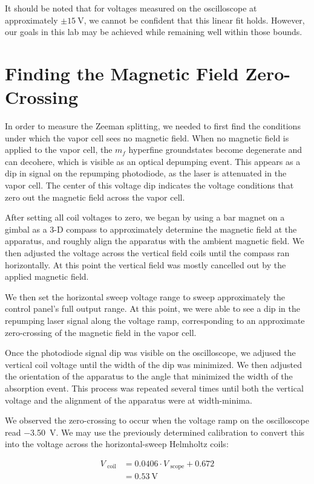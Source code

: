 \documentclass[letter]{article}
\begin{document}
It should be noted that for voltages measured on the oscilloscope at approximately $\pm \qty{15}{\V}$, we cannot be confident that this linear fit holds. However, our goals in this lab may be achieved while remaining well within those bounds.


\section{Finding the Magnetic Field Zero-Crossing}

In order to measure the Zeeman splitting, we needed to first find the conditions under which the vapor cell sees no magnetic field. When no magnetic field is applied to the vapor cell, the $m_f$ hyperfine groundstates become degenerate and can decohere, which is visible as an optical depumping event. This appears as a dip in signal on the repumping photodiode, as the laser is attenuated in the vapor cell. The center of this voltage dip indicates the voltage conditions that zero out the magnetic field across the vapor cell.

After setting all coil voltages to zero, we began by using a bar magnet on a gimbal as a 3-D compass to approximately determine the magnetic field at the apparatus, and roughly align the apparatus with the ambient magnetic field. We then adjusted the voltage across the vertical field coils until the compass ran horizontally. At this point the vertical field was mostly cancelled out by the applied magnetic field. 

We then set the horizontal sweep voltage range to sweep approximately the control panel's full output range. At this point, we were able to see a dip in the repumping laser signal along the voltage ramp, corresponding to an approximate zero-crossing of the magnetic field in the vapor cell.

Once the photodiode signal dip was visible on the oscilloscope, we adjused the vertical coil voltage until the width of the dip was minimized. We then adjusted the orientation of the apparatus to the angle that minimized the width of the absorption event. This process was repeated several times until both the vertical voltage and the alignment of the apparatus were at width-minima.

We observed the zero-crossing to occur when the voltage ramp on the oscilloscope read \qty{-3.50}{\V}. We may use the previously determined calibration to convert this into the voltage across the horizontal-sweep Helmholtz coils:

\begin{align*}
	V_{\text{ coil}} &= 0.0406 \cdot V_{\text{ scope}} + 0.672
	\\&= \qty{0.53}{\V}
\end{align*}
\end{document}

